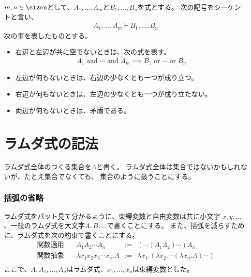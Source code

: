 {	\begin{definition}\label{def:シーケント} %
		$m,n\in\sizen$として、$A_1,\dots,A_m$と$B_1,\dots,B_n$を式とする。
		次の記号をシーケントと言い、
		\begin{equation*}\begin{split}
			A_1,\dots,A_m\vdash B_1,\dots,B_n 
		\end{split}\end{equation*}
		次の事を表したものとする。
		\begin{itemize}\setlength{\itemsep}{-1mm} %
			\item 右辺と左辺が共に空でないときは、次の式を表す。
			\begin{equation*}\begin{split}
				A_1\text{ and }\cdots\text{ and } A_m
				\implies B_1\text{ or }\cdots\text{ or } B_n
			\end{split}\end{equation*}
			\item 左辺が何もないときは、右辺の少なくとも一つが成り立つ。
			\item 右辺が何もないときは、左辺の少なくとも一つが成り立たない。
			\item 両辺が何もないときは、矛盾である。
		\end{itemize} %
	\end{definition} %
\section{ラムダ式の記法}\label{s1:ラムダ式の記法} %
	ラムダ式全体のつくる集合を$\Lambda$と書く。
	ラムダ式全体は集合ではないかもしれないが、たとえ集合でなくても、
	集合のように扱うことにする。

\subsubsection{括弧の省略}\label{s3:括弧の省略} %
	ラムダ式をパット見て分かるように、束縛変数と自由変数は共に小文字
	$x,y,\dots$、一般のラムダ式を大文字$A,B,\dots$で書くことにする。
	また、括弧を減らすために、ラムダ式を次の約束で書くことにする。
	\begin{equation*}\begin{array}{lrcll}
		\text{関数適用}\quad 
			& A_1A_2\cdots A_n &:=& (\cdots(A_1A_2)\cdots)A_n \\
		\text{関数抽象}\quad 
			& \lambda x_1x_2x_3\cdots x_n.A 
			&:=& \lambda x_1.(\lambda x_2.\cdots (\lambda x_n.A)\cdots) \\
	\end{array}\end{equation*}
	ここで、$A,A_1,\dots,A_n$はラムダ式、$x_1,\dots,x_n$は束縛変数とした。
}
